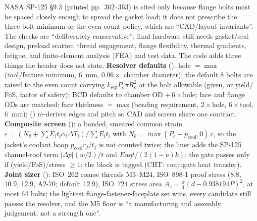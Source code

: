 NASA SP-125 \S9.3 (printed pp.~362--363) is cited only because flange bolts must be spaced closely enough to spread the gasket load; it does not prescribe the three-bolt minimum or the even-count policy, which are ``CAD/layout invariants''. The checks are ``deliberately conservative''; final hardware still needs gasket/seal design, preload scatter, thread engagement, flange flexibility, thermal gradients, fatigue, and finite-element analysis (FEA) and test data. The code adds three things the header does not state. \textbf{Resolver defaults} (): hole $=\max$(tool/feature minimum, 6~mm, $0.06\times$ chamber diameter); the default 8 bolts are raised to the even count carrying $k_\mathrm{sep}P_c\pi R_c^2$ at the bolt allowable (given, or yield$/$FoS, factor of safety); BCD defaults to chamber OD $+\,6\times$hole; face and flange ODs are matched; face thickness $=\max$(bending requirement, $2\times$hole, $6\times$tool, 6~mm);  () re-derives edges and pitch so CAD and screen share one contract. \textbf{Composite screen} (): a bonded, smeared common strain $\varepsilon = (N_\theta + \sum E_i t_i\alpha_i\Delta T_i)/\sum E_i t_i$ with $N_\theta = \max(P_c - p_\mathrm{cool}, 0)\,r$, so the jacket's coolant hoop $p_\mathrm{cool}r_j/t_j$ is not counted twice; the liner adds the SP-125 channel-roof term $|\Delta p|(w/2)/t$ and $E\alpha q t/(2(1-\nu)k)$; the gate passes only if (yield$/$FoS)$/$stress $\geq 1$; the block is tagged  (CHT: conjugate heat transfer). \textbf{Joint sizer} (): ISO~262 coarse threads M3--M24, ISO~898-1 proof stress (8.8, 10.9, 12.9, A2-70; default 12.9), ISO~724 stress area $A_s=\tfrac{\pi}{4}(d-0.938194P)^2$, at most 64 bolts; the lightest flange-fastener-faceplate set wins, every candidate still passes the resolver, and the M5 floor is ``a manufacturing and assembly judgement, not a strength one''.

